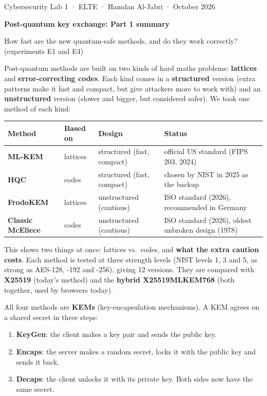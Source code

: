 \documentclass[10pt,a4paper]{article}
\newcommand{\key}[1]{\textbf{#1}}
\newcommand{\head}[1]{\par\Needspace{8\baselineskip}\vspace{10pt}{\sffamily\bfseries\large #1}\par\vspace{0pt}}
\begin{document}
{\sffamily\color{ink2}\small Cybersecurity Lab 1 · ELTE · Hamdan Al-Jabri · October 2026}\par
{\sffamily\bfseries\LARGE Post-quantum key exchange: Part 1 summary}\par
{\sffamily\color{mfour} How fast are the new quantum-safe methods, and do they work correctly? (experiments E1 and E4)}\par
\vspace{3pt}

\head{1\quad Which methods we compare, and why these four}
Post-quantum methods are built on two kinds of hard maths problems: \key{lattices} and \key{error-correcting codes}. Each kind comes in a \key{structured} version (extra patterns make it fast and compact, but give attackers more to work with) and an \key{unstructured} version (slower and bigger, but considered safer). We took one method of each kind:

\begin{table}[H]
\centering\small
\begin{tabular}{@{}llll@{}}
\toprule
\textbf{Method} & \textbf{Based on} & \textbf{Design} & \textbf{Status}\\
\midrule
\textcolor{fmlkem!80!black}{\textbf{ML-KEM}} & lattices & structured (fast, compact) & official US standard (FIPS 203, 2024)\\
\textcolor{fhqc!80!black}{\textbf{HQC}} & codes & structured (fast, compact) & chosen by NIST in 2025 as the backup\\
\textcolor{ffrodo!80!black}{\textbf{FrodoKEM}} & lattices & unstructured (cautious) & ISO standard (2026), recommended in Germany\\
\textcolor{fmce}{\textbf{Classic McEliece}} & codes & unstructured (cautious) & ISO standard (2026), oldest unbroken design (1978)\\
\bottomrule
\end{tabular}
\end{table}

This shows two things at once: lattices vs.\ codes, and \key{what the extra caution costs}. Each method is tested at three strength levels (NIST levels 1, 3 and 5, as strong as AES-128, -192 and -256), giving 12 versions. They are compared with \key{X25519} (today's method) and the \key{hybrid X25519MLKEM768} (both together, used by browsers today).

\head{2\quad What is a KEM?}
All four methods are \key{KEMs} (key-encapsulation mechanisms). A KEM agrees on a shared secret in three steps:
\begin{enumerate}
\item \key{KeyGen}: the client makes a key pair and sends the public key.
\item \key{Encaps}: the server makes a random secret, locks it with the public key and sends it back.
\item \key{Decaps}: the client unlocks it with its private key. Both sides now have the same secret.
\end{enumerate}
\end{document}
